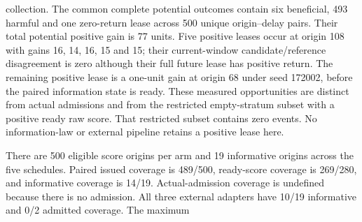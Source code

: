 collection.
The common complete potential outcomes contain six beneficial, 493 harmful 
and one zero-return lease across 500 unique origin--delay pairs. Their 
total potential positive gain is 77 units. Five positive leases occur at 
origin 108 with gains 16, 14, 16, 15 and 15; their current-window 
candidate/reference disagreement is zero although their full future 
lease has positive return. The remaining positive lease is a one-unit 
gain at origin 68 under seed 172002, before the paired information state 
is ready. These measured opportunities are distinct from actual 
admissions and from the restricted empty-stratum subset with a positive 
ready raw score. That restricted subset contains zero events. No 
information-law or external pipeline retains a positive lease here.
\begin{table}[t]\centering\small
\caption{Complete paired-minus-control action decomposition on mobile755. Each entry gives count/value across five delays; all eight controls are included. The mean difference divides the signed sum by five.}
\label{tab:mobile755-actions}
\end{table}
There are 500 eligible score origins per arm and 19 informative origins 
across the five schedules. Paired issued coverage is 489/500, ready-score 
coverage is 269/280, and informative coverage is 14/19. Actual-admission 
coverage is undefined because there is no admission. All three external 
adapters have 10/19 informative and 0/2 admitted coverage. The maximum 
